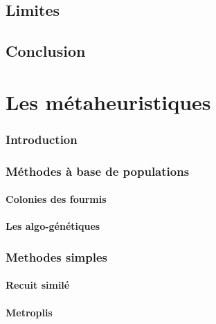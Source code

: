 \documentclass[a4paper,11pt,oneside]{report}
\theoremstyle{plain}
\newcommand{\0}{/ \! \! \! 0}
\theoremstyle{plain}
\begin{document}
\section{Limites}



\section{Conclusion}


\chapter{Les m\'etaheuristiques}


\subsection{Introduction}
 
\subsection{M\'ethodes \`a base de populations}

\subsubsection{Colonies des fourmis}

\subsubsection{Les algo-g\'en\'etiques}

\subsection{Methodes simples}

\subsubsection{Recuit simil\'e}

\subsubsection{Metroplis}
\end{document}
